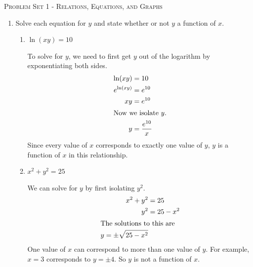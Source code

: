 \documentclass{article}
\begin{document}
\begin{center}
  \large\textsc{Problem Set 1 - Relations, Equations, and Graphs}
\end{center}

\begin{enumerate}
\item 
\begin{grading}
    
\end{grading}

\begin{problem}
    Solve each equation for $y$ and state whether or not $y$ a function of $x$.
\end{problem}

\begin{enumerate}

    \item
    \begin{problem}
        $\ln(xy)=10$
    \end{problem}
    \pspace{\vfill}

    \begin{solution}
        To solve for $y$, we need to first get $y$ out of the logarithm by exponentiating both sides.
        \begin{align*}
            \ln(xy) &= 10\\
            e^{\ln(xy)} &= e^{10} \\
            xy &= e^{10}\\
            \intertext{Now we isolate $y$.}
            y &= \frac{e^{10}}{x}
        \end{align*}
        Since every value of $x$ corresponds to exactly one value of $y$, $y$ is a function of $x$ in this relationship.
    \end{solution}

    \item 
    \begin{problem}
        $x^2+y^2=25$
    \end{problem}
    \pspace{\vfill}

    \begin{solution}
        We can solve for $y$ by first isolating $y^2$.
        \begin{align*}
            x^2+y^2 &= 25 \\
            y^2 &= 25-x^2 \\
            \intertext{The solutions to this are}
            y=\pm \sqrt{25-x^2}
        \end{align*}
    One value of $x$ can correspond to more than one value of $y$. For example, $x=3$ corresponds to $y=\pm4$. So $y$ is not a function of $x$. 
    \end{solution}


\end{enumerate}
\end{enumerate}
\end{document}
